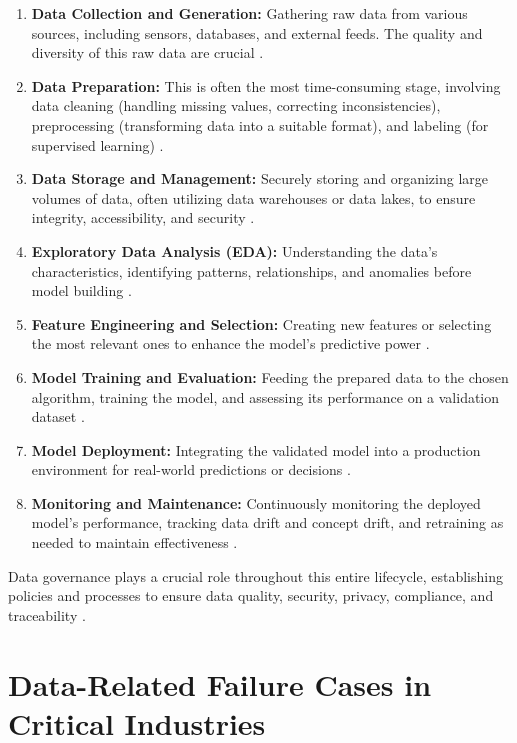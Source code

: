 \begin{enumerate}
    \item \textbf{Data Collection and Generation:} Gathering raw data from various sources, including sensors, databases, and external feeds. The quality and diversity of this raw data are crucial \parencite{DataCamp2023}.
    \item \textbf{Data Preparation:} This is often the most time-consuming stage, involving data cleaning (handling missing values, correcting inconsistencies), preprocessing (transforming data into a suitable format), and labeling (for supervised learning) \parencite{DataCamp2023}.
    \item \textbf{Data Storage and Management:} Securely storing and organizing large volumes of data, often utilizing data warehouses or data lakes, to ensure integrity, accessibility, and security \parencite{Komprise2023}.
    \item \textbf{Exploratory Data Analysis (EDA):} Understanding the data's characteristics, identifying patterns, relationships, and anomalies before model building \parencite{GeeksforGeeks2023}.
    \item \textbf{Feature Engineering and Selection:} Creating new features or selecting the most relevant ones to enhance the model's predictive power \parencite{GeeksforGeeks2023}.
    \item \textbf{Model Training and Evaluation:} Feeding the prepared data to the chosen algorithm, training the model, and assessing its performance on a validation dataset \parencite{DataCamp2023}.
    \item \textbf{Model Deployment:} Integrating the validated model into a production environment for real-world predictions or decisions \parencite{DataCamp2023}.
    \item \textbf{Monitoring and Maintenance:} Continuously monitoring the deployed model's performance, tracking data drift and concept drift, and retraining as needed to maintain effectiveness \parencite{Milvus2023}.
\end{enumerate}
Data governance plays a crucial role throughout this entire lifecycle, establishing policies and processes to ensure data quality, security, privacy, compliance, and traceability \parencite{IBM2023DataGovernance}.

\section{Data-Related Failure Cases in Critical Industries}
\label{sec:data_failure_cases}

